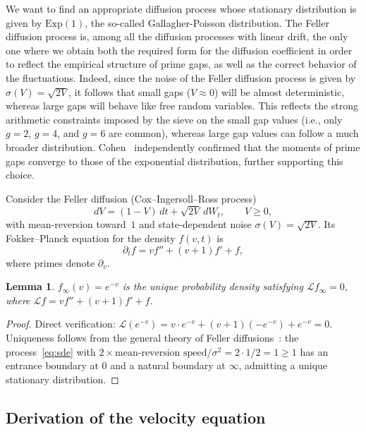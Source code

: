 \documentclass[11pt, a4paper]{amsart}
\theoremstyle{plain}
\newtheorem{lemma}[theorem]{Lemma}
\theoremstyle{definition}
\newcommand{\cL}{\mathcal{L}}
\begin{document}
We want to find an appropriate diffusion process whose stationary distribution is given by $\mathrm{Exp}(1)$, 
the so-called Gallagher-Poisson distribution. The Feller diffusion process is, among all the diffusion processes with linear drift, 
the only one where we obtain both the required form for the diffusion coefficient in order to reflect the empirical structure of prime gaps, 
as well as the correct behavior of the fluctuations. Indeed, since the noise of the Feller diffusion process is given by $\sigma(V) = \sqrt{2V}$, 
it follows that small gaps ($V \approx 0$) will be almost deterministic, whereas large gaps will behave like free random variables. 
This reflects the strong arithmetic constraints imposed by the sieve on the small gap values (i.e., only $g=2$, $g=4$, and $g=6$ are common), 
whereas large gap values can follow a much broader distribution. Cohen~\cite{Cohen2024} independently confirmed that the moments of prime gaps 
converge to those of the exponential distribution, further supporting this choice.

Consider the Feller diffusion (Cox--Ingersoll--Ross process)
\begin{equation}\label{eq:sde}
dV = (1 - V)\,dt + \sqrt{2V}\,dW_t, \qquad V \ge 0,
\end{equation}
with mean-reversion toward~$1$ and state-dependent noise $\sigma(V) = \sqrt{2V}$.
Its Fokker--Planck equation for the density $f(v,t)$ is
\begin{equation}\label{eq:fp}
\partial_t f = v f'' + (v+1)f' + f,
\end{equation}
where primes denote $\partial_v$.

\begin{lemma}\label{lem:stationary}
$f_\infty(v) = e^{-v}$ is the unique probability density satisfying $\cL f_\infty = 0$, where $\cL f = vf'' + (v+1)f' + f$.
\end{lemma}

\begin{proof}
Direct verification: $\cL(e^{-v}) = v \cdot e^{-v} + (v+1)(-e^{-v}) + e^{-v} = 0$.
Uniqueness follows from the general theory of Feller diffusions~\cite{Risken1989}: 
the process~\eqref{eq:sde} with $2 \times \text{mean-reversion speed} / \sigma^2 = 2 \cdot 1 / 2 = 1 \ge 1$ 
has an entrance boundary at $0$ and a natural boundary at $\infty$, 
admitting a unique stationary distribution.
\end{proof}

\subsection{Derivation of the velocity equation}
\end{document}
